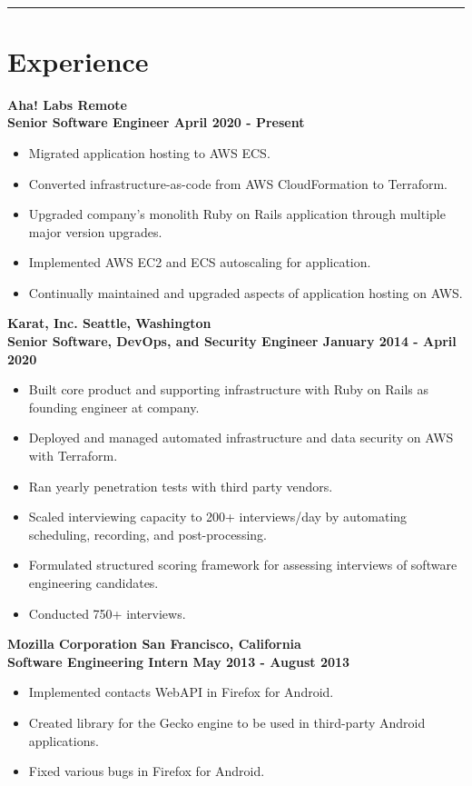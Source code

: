 \documentclass[letterpaper]{article}
\newcommand{\setfontsize}{\fontsize{11.5}{16}\selectfont}
\newcommand{\sectionrule}[1] {
  \noindent\rule{\textwidth}{.1mm}
  \vspace{-11mm}
  \section{#1}
}
\newenvironment{indentsection}
  {\begin{adjustwidth}{10mm}{0pt}}
  {\end{adjustwidth}}
\newcommand{\job}[5] {
  \noindent\textbf{#1 \hfill #2}\\
  \textbf{#3 \hfill #4 - #5}

  \vspace{1mm}
}
\begin{document}
  \setfontsize

  \vspace{2mm}\\

  \sectionrule{Experience}

  \begin{indentsection}
    \job{Aha! Labs}{Remote}{Senior Software Engineer}{April 2020}{Present}
    \begin{itemize}
      \item Migrated application hosting to AWS ECS.
      \item Converted infrastructure-as-code from AWS CloudFormation to Terraform.
      \item Upgraded company's monolith Ruby on Rails application through multiple major version upgrades.
      \item Implemented AWS EC2 and ECS autoscaling for application.
      \item Continually maintained and upgraded aspects of application hosting on AWS.
    \end{itemize}

    \vspace{3mm}

    \job{Karat, Inc.}{Seattle, Washington}{Senior Software, DevOps, and Security Engineer}{January 2014}{April 2020}
    \begin{itemize}
      \item Built core product and supporting infrastructure with Ruby on Rails as founding engineer at company.
      \item Deployed and managed automated infrastructure and data security on AWS with Terraform.
      \item Ran yearly penetration tests with third party vendors.
      \item Scaled interviewing capacity to 200+ interviews/day by automating scheduling, recording, and post-processing.
      \item Formulated structured scoring framework for assessing interviews of software engineering candidates.
      \item Conducted 750+ interviews.
    \end{itemize}

    \vspace{3mm}

    \job{Mozilla Corporation}{San Francisco, California}{Software Engineering Intern}{May 2013}{August 2013}
    \begin{itemize}
      \item Implemented contacts WebAPI in Firefox for Android.
      \item Created library for the Gecko engine to be used in third-party Android applications.
      \item Fixed various bugs in Firefox for Android.
    \end{itemize}
  \end{indentsection}
\end{document}

